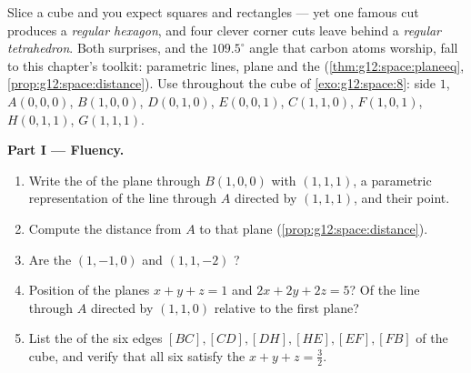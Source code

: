 \begin{problem}
\label{pb:g12:space:1}
Slice a cube and you expect squares and rectangles --- yet one
famous cut produces a \emph{regular hexagon}, and four clever
corner cuts leave behind a \emph{regular tetrahedron}. Both
surprises, and the $109.5^\circ$ angle that carbon atoms worship,
fall to this chapter's toolkit: parametric lines, plane 
and the  (\cref{thm:g12:space:planeeq},
\cref{prop:g12:space:distance}). Use throughout the cube of
\cref{exo:g12:space:8}: side $1$, $A(0,0,0)$, $B(1,0,0)$,
$D(0,1,0)$, $E(0,0,1)$, $C(1,1,0)$, $F(1,0,1)$, $H(0,1,1)$,
$G(1,1,1)$.

\medskip
\noindent\textbf{Part I --- Fluency.}
\begin{enumerate}
  \item Write the  of the plane through $B(1,0,0)$ with
         $(1,1,1)$, a parametric representation of
        the line through $A$ directed by $(1,1,1)$, and their
         point.
  \item Compute the distance from $A$ to that plane
        (\cref{prop:g12:space:distance}).
  \item Are the  $(1,-1,0)$ and $(1,1,-2)$ ?
  \item Position of the planes $x + y + z = 1$ and
        $2x + 2y + 2z = 5$? Of the line through $A$ directed by
        $(1,1,0)$ relative to the first plane?
  \item List the  of the six edges
        $[BC], [CD], [DH], [HE], [EF], [FB]$ of the cube, and
        verify that all six satisfy the 
        $x + y + z = \frac32$.
\end{enumerate}


\end{problem}
